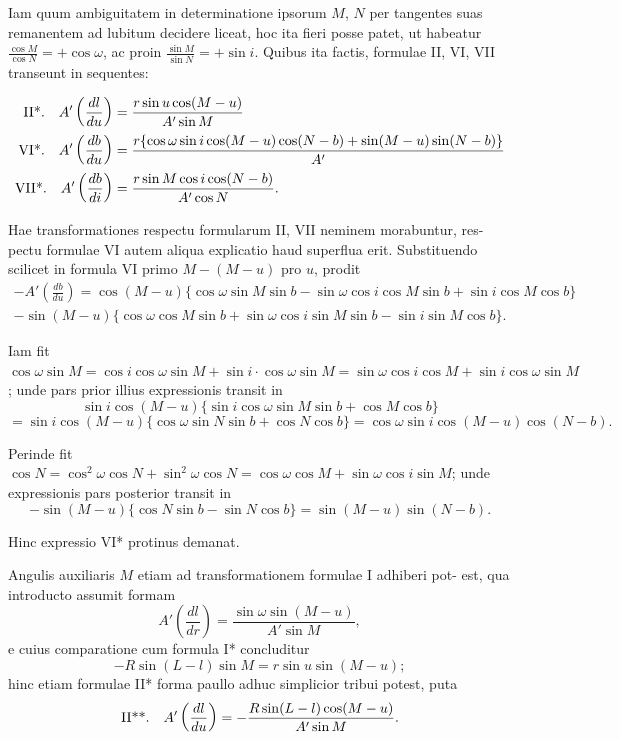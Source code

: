 \documentclass[12pt,a4paper]{article}
\begin{document}
Iam quum ambiguitatem in determinatione ipsorum $M$, $N$ per tangentes suas
remanentem ad lubitum decidere liceat, hoc ita fieri posse patet, ut habeatur
$\frac{\cos M}{\cos N} = +\cos\omega$, ac proin $\frac{\sin M}{\sin N} = +\sin i$. Quibus ita factis, formulae II, VI,
VII transeunt in sequentes:

\begin{align*}
\text{II*.\quad} A'\left(\frac{dl}{du}\right) &= \frac{r\sin u\cos(M - u)}{A'\sin M} \\
\text{VI*.\quad} A'\left(\frac{db}{du}\right) &= \frac{r\{\cos\omega\sin i\cos(M - u)\cos(N - b) + \sin(M - u)\sin(N - b)\}}{A'} \\
\text{VII*.\quad} A'\left(\frac{db}{di}\right) &= \frac{r\sin M\cos i\cos(N - b)}{A'\cos N}.
\end{align*}

Hae transformationes respectu formularum II, VII neminem morabuntur, res-
pectu formulae VI autem aliqua explicatio haud superflua erit. Substituendo
scilicet in formula VI primo $M - (M - u)$ pro $u$, prodit
\begin{multline*}
-A'\left(\frac{db}{du}\right) = \cos(M - u)\bigl\{\cos\omega\sin M\sin b - \sin\omega\cos i\cos M\sin b + \sin i\cos M\cos b\bigr\} \\
- \sin(M - u)\bigl\{\cos\omega\cos M\sin b + \sin\omega\cos i\sin M\sin b - \sin i\sin M\cos b\bigr\}.
\end{multline*}

Iam fit $\cos\omega\sin M = \cos i\cos\omega\sin M + \sin i\cdot\cos\omega\sin M = \sin\omega\cos i\cos M +
\sin i\cos\omega\sin M$; unde pars prior illius expressionis transit in
\[
\sin i\cos(M - u)\bigl\{\sin i\cos\omega\sin M\sin b + \cos M\cos b\bigr\}
\]
\[
= \sin i\cos(M - u)\bigl\{\cos\omega\sin N\sin b + \cos N\cos b\bigr\}
= \cos\omega\sin i\cos(M - u)\cos(N - b).
\]

Perinde fit $\cos N = \cos^2\omega\cos N + \sin^2\omega\cos N = \cos\omega\cos M + \sin\omega\cos i\sin M$;
unde expressionis pars posterior transit in
\[
-\sin(M - u)\bigl\{\cos N\sin b - \sin N\cos b\bigr\} = \sin(M - u)\sin(N - b).
\]

Hinc expressio VI* protinus demanat.

Angulis auxiliaris $M$ etiam ad transformationem formulae I adhiberi pot-
est, qua introducto assumit formam
\[
A'\left(\frac{dl}{dr}\right) = \frac{\sin\omega\sin(M - u)}{A'\sin M},
\]
e cuius comparatione cum formula I* concluditur
\[
-R\sin(L - l)\sin M = r\sin u\sin(M - u);
\]
hinc etiam formulae II* forma paullo adhuc simplicior tribui potest, puta
\[
\text{II**.\quad} A'\left(\frac{dl}{du}\right) = -\frac{R\sin(L - l)\cos(M - u)}{A'\sin M}.
\]
\end{document}
